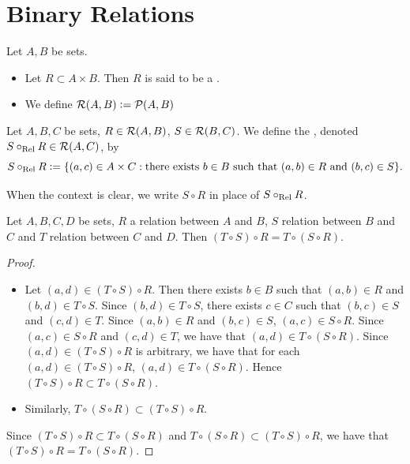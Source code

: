 \newpage
\section{Binary Relations}

\begin{defn}
	Let $A, B$ be sets.
	\begin{itemize}
		\item Let $R \subset A \times B$. Then $R$ is said to be a . 
		\item We define $\mathcal{R}(A,B) \vcentcolon= \mathcal{P}(A, B)$ 
	\end{itemize}
\end{defn}

\begin{defn}
	Let $A,B,C$ be sets, $R \in \mathcal{R}(A,B)$, $S \in \mathcal{R}(B,C)$. We define the , denoted $S \circ_{\text{Rel}} R \in \mathcal{R}(A, C)$, by 
	$$S \circ_{\text{Rel}} R \vcentcolon= \{(a,c) \in A \times C: \text{there exists $b \in B$ such that $(a,b) \in R$ and $(b,c) \in S$}\}.$$
\end{defn}

\begin{note}
	When the context is clear, we write $S \circ R$ in place of $S \circ_{\text{Rel}} R$.
\end{note}

\begin{ex}
	Let $A,B, C, D$ be sets, $R$ a relation between $A$ and $B$, $S$ relation between $B$ and $C$ and $T$ relation between $C$ and $D$. Then $(T \circ S) \circ R = T \circ (S \circ R)$.
\end{ex}

\begin{proof}\
	\begin{itemize}
		\item Let $(a,d) \in (T \circ S) \circ R$. Then there exists $b \in B$ such that $(a,b) \in R$ and $(b,d) \in T \circ S$. Since $(b,d) \in T \circ S$, there exists $c \in C$ such that $(b,c) \in S$ and $(c,d) \in T$. Since $(a,b) \in R$ and $(b,c) \in S$, $(a,c) \in S \circ R$. Since $(a,c) \in S \circ R$ and $(c,d) \in T$, we have that $(a,d) \in T \circ (S \circ R)$. Since $(a,d) \in (T \circ S) \circ R$ is arbitrary, we have that for each $(a,d) \in (T \circ S) \circ R$, $(a,d) \in T \circ (S \circ R)$. Hence $(T \circ S) \circ R \subset T \circ (S \circ R)$.
		\item Similarly, $T \circ (S \circ R) \subset (T \circ S) \circ R$. 
	\end{itemize}
	Since $(T \circ S) \circ R \subset T \circ (S \circ R)$ and $T \circ (S \circ R) \subset (T \circ S) \circ R$, we have that $(T \circ S) \circ R = T \circ (S \circ R)$.
\end{proof}




